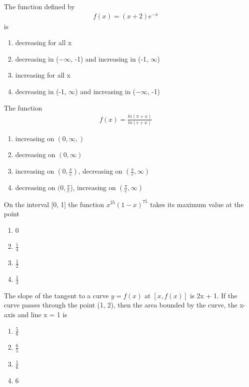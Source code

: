 \item The function defined by 
\begin{align*} 
f(x) = (x + 2)e^{-x} 
\end{align*} 
is
\begin{enumerate}
\item decreasing for all x
\item decreasing in ($-\infty$, -1) and increasing in (-1, $\infty$) 
\item increasing for all x
\item decreasing in (-1, $\infty$) and increasing in ($-\infty$, -1) 
\end{enumerate}

\item The function 
\begin{align*}
f(x) = \frac{ln(\pi + x)}{ln(e + x)}
\end{align*}
\begin{enumerate}
\item increasing on $(0, \infty,)$ 
\item decreasing on $(0, \infty)$
\item increasing on $(0, \frac{\pi}{e})$, decreasing on $(\frac{\pi}{e}, \infty)$
\item decreasing on $(0, \frac{\pi}{e}$), increasing on $(\frac{\pi}{e}, \infty)$
\end{enumerate}

\item On the interval [0, 1] the function $x^{25}(1 - x)^{75}$ takes its maximum value at the point
\begin{enumerate}
\item 0
\item $\frac{1}{4}$
\item $\frac{1}{2}$
\item $\frac{1}{3}$
\end{enumerate}

\item The slope of the tangent to a curve  
$y = f(x)$ at $[x, f(x)]$ is 2x + 1. If the curve passes through the point (1, 2), then the area bounded by the curve, the x-axis and line x = 1 is
\begin{enumerate}
\item $\frac{5}{6}$
\item $\frac{6}{5}$
\item $\frac{1}{6}$
\item 6
\end{enumerate}

